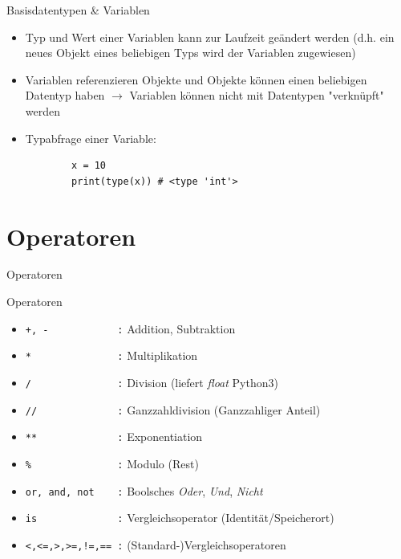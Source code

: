 \documentclass[utf8, smaller, c]{beamer}
\begin{document}
\begin{frame}{Basisdatentypen \& Variablen}
	\vspace*{-2mm}
	\begin{itemize}
		\item Typ und Wert einer Variablen kann zur Laufzeit geändert werden (d.h. ein neues Objekt eines beliebigen Typs wird der Variablen zugewiesen)
		\item Variablen referenzieren Objekte und Objekte können einen beliebigen Datentyp haben $\rightarrow$ Variablen können nicht mit Datentypen "verknüpft" werden
		\item Typabfrage einer Variable:
		\begin{verbatim}
		x = 10
		print(type(x)) # <type 'int'>
		\end{verbatim}
	\end{itemize}
\end{frame}

\section{Operatoren}
\begin{frame}[fragile]{Operatoren}
	\begin{block}{Operatoren}
	\begin{itemize}
		\item \verb|+, -            :| Addition, Subtraktion
		\item \verb|*               :| Multiplikation
		\item \verb|/               :| Division (liefert \textit{float} Python3) 
		\item \verb|//              :| Ganzzahldivision (Ganzzahliger Anteil)
		\item \verb|**              :| Exponentiation
		\item \verb|%               :| Modulo (Rest)
		\item \verb|or, and, not    :| Boolsches \textit{Oder}, \textit{Und}, \textit{Nicht}
		\item \verb|is              :| Vergleichsoperator (Identität/Speicherort)
		\item \verb|<,<=,>,>=,!=,== :| (Standard-)Vergleichsoperatoren
	\end{itemize}
	\end{block}
\end{frame}
\end{document}
